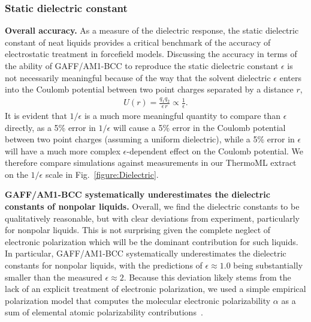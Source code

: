 \documentclass[journal=jacsat,manuscript=article]{achemso}
\begin{document}

\subsubsection{Static dielectric constant}
\label{section:results:static-dielectric-constant}

{\bf Overall accuracy.}
As a measure of the dielectric response, the static dielectric constant of neat liquids provides a critical benchmark of the accuracy of electrostatic treatment in forcefield models.  
Discussing the accuracy in terms of the ability of GAFF/AM1-BCC to reproduce the static dielectric constant $\epsilon$ is not necessarily meaningful because of the way that the solvent dielectric $\epsilon$ enters into the Coulomb potential between two point charges separated by a distance $r$,
\begin{eqnarray}
U(r) = \frac{q_1 q_2}{\epsilon \, r} \propto \frac{1}{\epsilon} .
\end{eqnarray}
It is evident that $1/\epsilon$ is a much more meaningful quantity to compare than $\epsilon$ directly, as a 5\% error in $1/\epsilon$ will cause a 5\% error in the Coulomb potential between two point charges (assuming a uniform dielectric), while a 5\% error in $\epsilon$ will have a much more complex $\epsilon$-dependent effect on the Coulomb potential.
We therefore compare simulations against measurements in our ThermoML extract on the $1/\epsilon$ scale in Fig.~\ref{figure:Dielectric}.  


{\bf GAFF/AM1-BCC systematically underestimates the dielectric constants of nonpolar liquids.}
Overall, we find the dielectric constants to be qualitatively reasonable, but with clear deviations from experiment, particularly for nonpolar liquids. 
This is not surprising given the complete neglect of electronic polarization which will be the dominant contribution for such liquids.
In particular, GAFF/AM1-BCC systematically underestimates the dielectric constants for nonpolar liquids, with the predictions of $\epsilon \approx 1.0 $ being substantially smaller than the measured $\epsilon \approx 2$.  
Because this deviation likely stems from the lack of an explicit treatment of electronic polarization, we used a simple empirical polarization model that computes the molecular electronic polarizability $\alpha$ as a sum of elemental atomic polarizability contributions~\cite{bosque2002polarizabilities}.
\end{document}
